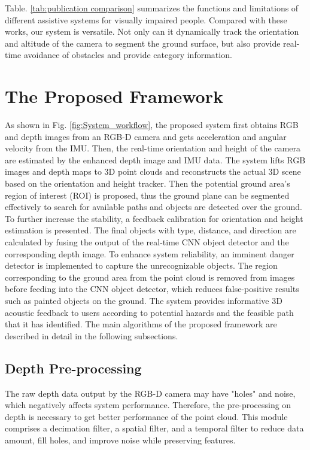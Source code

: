 \documentclass{ieeeaccess}
\begin{document}
Table. \ref{tab:publication comparison} summarizes the functions and limitations of different assistive systems for visually impaired people. Compared with these works, our system is versatile. Not only can it dynamically track the orientation and altitude of the camera to segment the ground surface, but also provide real-time avoidance of obstacles and provide category information.

\section{The Proposed Framework} \label{section:framework}

As shown in Fig. \ref{fig:System_workflow}, the proposed system first obtains RGB and depth images from an RGB-D camera and gets acceleration and angular velocity from the IMU. Then, the real-time orientation and height of the camera are estimated by the enhanced depth image and IMU data. The system lifts RGB images and depth maps to 3D point clouds and reconstructs the actual 3D scene based on the orientation and height tracker. Then the potential ground area's region of interest (ROI) is proposed, thus the ground plane can be segmented effectively to search for available paths and  objects are detected over the ground. To further increase the stability, a feedback calibration for orientation and height estimation is presented.  The final objects with type, distance, and direction are calculated by fusing the output of the real-time CNN object detector and the corresponding depth image. To enhance system reliability, an imminent danger detector is implemented to capture the unrecognizable objects. The region corresponding to the ground area from the point cloud is removed from images before feeding into the CNN object detector, which reduces false-positive results such as painted objects on the ground. The system provides informative 3D acoustic feedback to users according to potential hazards and the feasible path that it has identified. The main algorithms of the proposed framework are described in detail in the following subsections.




\subsection{Depth Pre-processing}
The raw depth data output by the RGB-D camera may have "holes" and noise, which negatively affects system performance. Therefore, the pre-processing on depth is necessary to get better performance of the point cloud. This module comprises a decimation filter, a spatial filter, and a temporal filter to reduce data amount, fill holes, and improve noise while preserving features. 
\end{document}
